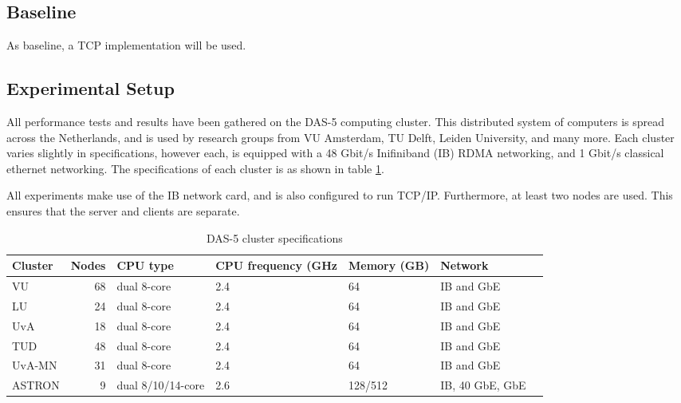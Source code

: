 \subsection{Baseline}
As baseline, a TCP implementation will be used.

\subsection{Experimental Setup}
All performance tests and results have been gathered on the DAS-5 computing cluster.
This distributed system of computers is spread across the Netherlands, and is used by research groups from VU Amsterdam, TU Delft, Leiden University, and many more.
Each cluster varies slightly in specifications, however each, is equipped with a 48 Gbit/s Inifiniband (IB) RDMA networking, and 1 Gbit/s classical ethernet networking.
The specifications of each cluster is as shown in table \ref{tab:das5}.

All experiments make use of the IB network card, and is also configured to run TCP/IP.
Furthermore, at least two nodes are used.
This ensures that the server and clients are separate.

\begin{table}
    \centering
    \begin{tabular}{lrlllll}
        \toprule
        \textbf{Cluster} & \textbf{Nodes} & \textbf{CPU type} & \textbf{CPU frequency (GHz} & \textbf{Memory (GB)} & \textbf{Network} \\
        \midrule
        VU & 68 & dual 8-core & 2.4 & 64 & IB and GbE \\
        LU & 24 & dual 8-core & 2.4 & 64 & IB and GbE \\
        UvA & 18 & dual 8-core & 2.4 & 64 & IB and GbE \\
        TUD & 48 & dual 8-core & 2.4 & 64 & IB and GbE \\
        UvA-MN & 31 & dual 8-core & 2.4 & 64 & IB and GbE \\
        ASTRON & 9 & dual 8/10/14-core & 2.6 & 128/512 & IB, 40 GbE, GbE \\
        \bottomrule
    \end{tabular}
    \caption{DAS-5 cluster specifications}
    \label{tab:das5}
\end{table}






